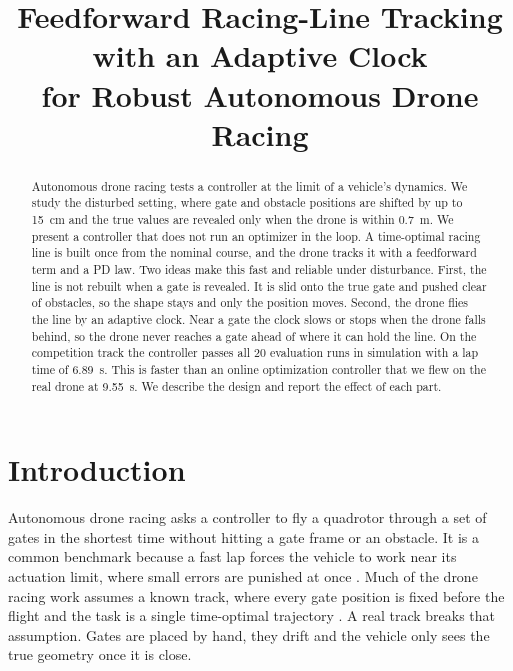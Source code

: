 \documentclass[conference]{IEEEtran}
\begin{document}
\title{Feedforward Racing-Line Tracking with an Adaptive Clock\\ for Robust Autonomous Drone Racing}

\author{
\and
{}
}

\maketitle

\begin{abstract}
Autonomous drone racing tests a controller at the limit of a vehicle's dynamics. We study the disturbed setting, where gate and obstacle positions are shifted by up to 15~cm and the true values are revealed only when the drone is within 0.7~m. We present a controller that does not run an optimizer in the loop. A time-optimal racing line is built once from the nominal course, and the drone tracks it with a feedforward term and a PD law. Two ideas make this fast and reliable under disturbance. First, the line is not rebuilt when a gate is revealed. It is slid onto the true gate and pushed clear of obstacles, so the shape stays and only the position moves. Second, the drone flies the line by an adaptive clock. Near a gate the clock slows or stops when the drone falls behind, so the drone never reaches a gate ahead of where it can hold the line. On the competition track the controller passes all 20 evaluation runs in simulation with a lap time of 6.89~s. This is faster than an online optimization controller that we flew on the real drone at 9.55~s. We describe the design and report the effect of each part.
\end{abstract}

\section{Introduction}
Autonomous drone racing asks a controller to fly a quadrotor through a set of gates in the shortest time without hitting a gate frame or an obstacle. It is a common benchmark because a fast lap forces the vehicle to work near its actuation limit, where small errors are punished at once \cite{survey}. Much of the drone racing work assumes a known track, where every gate position is fixed before the flight and the task is a single time-optimal trajectory \cite{foehn,minsnap}. A real track breaks that assumption. Gates are placed by hand, they drift and the vehicle only sees the true geometry once it is close.
\end{document}
